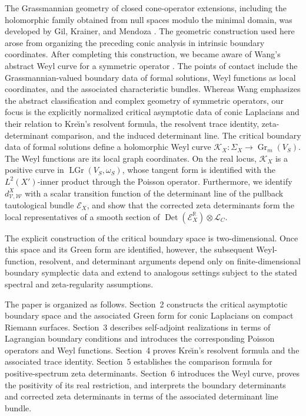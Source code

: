 \documentclass[12pt]{amsart}
\theoremstyle{plain}
\theoremstyle{definition}
\theoremstyle{remark}
\numberwithin{equation}{section} \numberwithin{figure}{section}
\renewcommand*{\to}{\rightarrow}
\newcommand{\mb}[1]{\mathbb{#1}} %
\newcommand{\mc}[1]{\mathcal{#1}}
\begin{document}
The Grassmannian geometry of closed cone-operator extensions,
including the holomorphic family obtained from null spaces modulo the
minimal domain, was developed by Gil, Krainer, and Mendoza
\cite{GilKrainerMendoza2007}. The geometric construction used here
arose from organizing the preceding conic analysis in intrinsic
boundary coordinates. After completing this construction, we became
aware of Wang's abstract Weyl curve for a symmetric operator
\cite{WangWeylCurve}. The points of contact include the
Grassmannian-valued boundary data of formal solutions, Weyl functions
as local coordinates, and the associated characteristic bundles.
Whereas Wang emphasizes the abstract classification and complex
geometry of symmetric operators, our focus is the explicitly
normalized critical asymptotic data of conic Laplacians and their
relation to Kre\u{\i}n's resolvent formula, the resolvent trace identity,
zeta-determinant comparison, and the induced determinant line. The
critical boundary data of formal solutions
define a holomorphic Weyl curve
\(
    \mc K_X:
    \Sigma_X\to\operatorname{Gr}_m(V_S).
\)
The Weyl functions are its local graph coordinates. On the real
locus, \(\mc K_X\) is a positive curve in
\(\operatorname{LGr}(V_S,\omega_S)\), whose tangent form is identified
with the \(L^2(X')\)-inner product through the Poisson operator.
Furthermore, we identify \(d_{\mc V,\mc W}^X\) with a scalar
transition function of the determinant line of the pullback
tautological bundle \(\mc E_X\), and show that the corrected zeta
determinants form the local representatives of a smooth section of
\(
    \operatorname{Det}(\mc E_X^{\mb R})
    \otimes
    \mc L_C.
\)

The explicit construction of the critical boundary space is
two-dimensional. Once this space and its Green form are identified,
however, the subsequent Weyl-function, resolvent, and determinant
arguments depend only on finite-dimensional boundary symplectic data
and extend to analogous settings subject to the stated spectral and
zeta-regularity assumptions.

The paper is organized as follows. Section~2 constructs the critical
asymptotic boundary space and the associated Green form for conic
Laplacians on compact Riemann surfaces. Section~3 describes
self-adjoint realizations in terms of Lagrangian boundary conditions
and introduces the corresponding Poisson operators and Weyl
functions. Section~4 proves Kre\u{\i}n's resolvent formula and the
associated trace identity. Section~5 establishes the comparison
formula for positive-spectrum zeta determinants. Section~6 introduces
the Weyl curve, proves the positivity of its real restriction, and
interprets the boundary determinants and corrected zeta determinants
in terms of the associated determinant line bundle.
\end{document}
